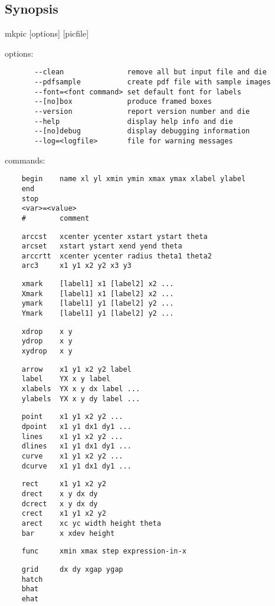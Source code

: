 \documentclass[a4paper,twocolumn]{article}
\begin{document}
\subsection{Synopsis\label{SYNOPSIS}}

mkpic [options] [picfile]

options:

\begin{verbatim}
       --clean               remove all but input file and die
       --pdfsample           create pdf file with sample images
       --font=<font command> set default font for labels
       --[no]box             produce framed boxes
       --version             report version number and die
       --help                display help info and die
       --[no]debug           display debugging information
       --log=<logfile>       file for warning messages
\end{verbatim}

commands:

\begin{verbatim}
    begin    name xl yl xmin ymin xmax ymax xlabel ylabel
    end    
    stop    
    <var>=<value>
    #        comment
\end{verbatim}
\begin{verbatim}
    arccst   xcenter ycenter xstart ystart theta
    arcset   xstart ystart xend yend theta
    arccrtt  xcenter ycenter radius theta1 theta2
    arc3     x1 y1 x2 y2 x3 y3
\end{verbatim}
\begin{verbatim}
    xmark    [label1] x1 [label2] x2 ...
    Xmark    [label1] x1 [label2] x2 ...
    ymark    [label1] y1 [label2] y2 ...
    Ymark    [label1] y1 [label2] y2 ...
\end{verbatim}
\begin{verbatim}
    xdrop    x y
    ydrop    x y
    xydrop   x y
\end{verbatim}
\begin{verbatim}
    arrow    x1 y1 x2 y2 label
    label    YX x y label
    xlabels  YX x y dx label ...
    ylabels  YX x y dy label ...
\end{verbatim}
\begin{verbatim}
    point    x1 y1 x2 y2 ...
    dpoint   x1 y1 dx1 dy1 ...
    lines    x1 y1 x2 y2 ...
    dlines   x1 y1 dx1 dy1 ...
    curve    x1 y1 x2 y2 ...
    dcurve   x1 y1 dx1 dy1 ...
\end{verbatim}
\begin{verbatim}
    rect     x1 y1 x2 y2
    drect    x y dx dy
    dcrect   x y dx dy
    crect    x1 y1 x2 y2
    arect    xc yc width height theta
    bar      x xdev height
\end{verbatim}
\begin{verbatim}
    func     xmin xmax step expression-in-x
\end{verbatim}
\begin{verbatim}
    grid     dx dy xgap ygap
    hatch    
    bhat    
    ehat
\end{verbatim}
\end{document}
